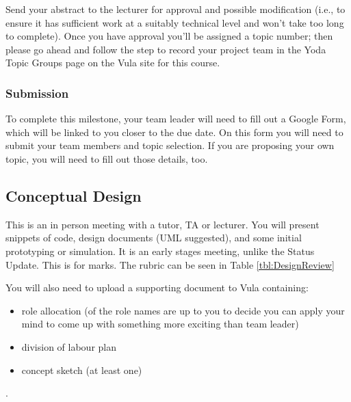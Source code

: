 Send your abstract to the lecturer for approval and possible modification (i.e., to ensure it has sufficient work at a suitably technical level and won't take too long to complete). Once you have approval you'll be assigned a topic number; then please go ahead and follow the step to record your project team in the Yoda Topic Groups page on the Vula site for this course.

\subsubsection{Submission}
To complete this milestone, your team leader will need to fill out a Google Form, which will be linked to you closer to the due date. On this form you will need to submit your team members and topic selection. If you are proposing your own topic, you will need to fill out those details, too.

\subsection{Conceptual Design}
\label{ms:conceptualdesign}
This is an in person meeting with a tutor, TA or lecturer. You will present snippets of code, design documents (UML suggested), and some initial prototyping or simulation. It is an early stages meeting, unlike the Status Update. This is for marks. The rubric can be seen in Table \ref{tbl:DesignReview}

You will also need to upload a supporting document to Vula containing:
\begin{itemize}
    \item role allocation (of the role names are up to you to decide you can apply your mind to come up with something more exciting than team leader)
    \item division of labour plan
    \item concept sketch (at least one)
\end{itemize}
.

